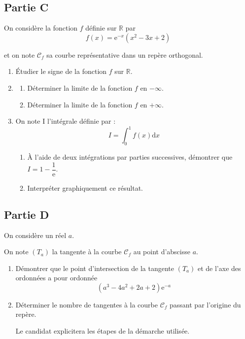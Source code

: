\documentclass[10pt]{article}
\providecommand{\R}{\mathbb{R}}
\providecommand{\e}{{\mathrm{e}}}
\renewcommand{\d}{{\mathrm{d}}}
\begin{document}
\subsection*{Partie C}
On considère la fonction $f$ définie sur $\R$ par
\[f(x)=\e^{-x}\left(x^{2}-3 x+2\right)\]

et on note $\mathcal{C}_{f}$ sa courbe représentative dans un repère orthogonal.

\begin{enumerate}
	\item Étudier le signe de la fonction $f$ sur $\R$.

	\item \begin{enumerate}
		\item Déterminer la limite de la fonction $f$ en $-\infty$.

		\item Déterminer la limite de la fonction $f$ en $+\infty$.
	\end{enumerate}

	\item On note I l'intégrale définie par :
	\[I=\int_{0}^{1} f(x) \d x\]

	\begin{enumerate}
		\item À l'aide de deux intégrations par parties successives, démontrer que \quad $I=1-\dfrac{1}{\e}$.

		\item Interpréter graphiquement ce résultat.
	\end{enumerate}
\end{enumerate}

\subsection*{Partie D}
On considère un réel $a$.

On note $\left(T_{a}\right)$ la tangente à la courbe $\mathcal{C}_{f}$ au point d'abscisse $a$.

\begin{enumerate}
	\item Démontrer que le point d'intersection de la tangente $(T_{a})$ et de l'axe des ordonnées a pour ordonnée
	\[\left(a^{3}-4 a^{2}+2 a+2\right) \e^{-a}\]

	\item Déterminer le nombre de tangentes à la courbe $\mathcal{C}_{f}$ passant par l'origine du repère.

	Le candidat explicitera les étapes de la démarche utilisée.
\end{enumerate}
\end{document}
